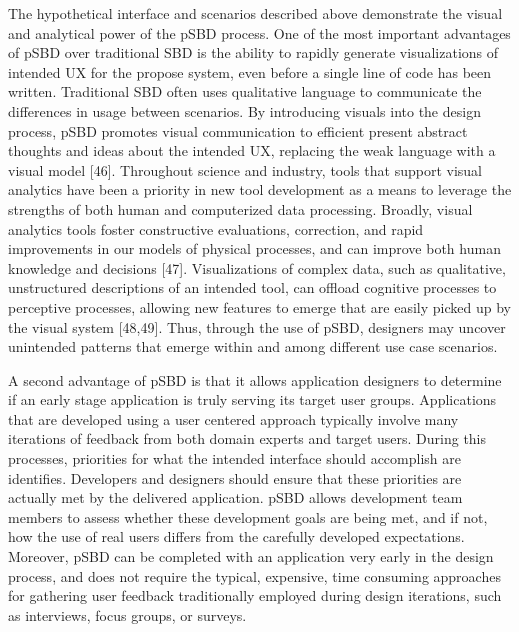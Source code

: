 \documentclass[]{article}
\begin{document}
The hypothetical interface and scenarios described above demonstrate the
visual and analytical power of the pSBD process. One of the most
important advantages of pSBD over traditional SBD is the ability to
rapidly generate visualizations of intended UX for the propose system,
even before a single line of code has been written. Traditional SBD
often uses qualitative language to communicate the differences in usage
between scenarios. By introducing visuals into the design process, pSBD
promotes visual communication to efficient present abstract thoughts and
ideas about the intended UX, replacing the weak language with a visual
model {[}46{]}. Throughout science and industry, tools that support
visual analytics have been a priority in new tool development as a means
to leverage the strengths of both human and computerized data
processing. Broadly, visual analytics tools foster constructive
evaluations, correction, and rapid improvements in our models of
physical processes, and can improve both human knowledge and decisions
{[}47{]}. Visualizations of complex data, such as qualitative,
unstructured descriptions of an intended tool, can offload cognitive
processes to perceptive processes, allowing new features to emerge that
are easily picked up by the visual system {[}48,49{]}. Thus, through the
use of pSBD, designers may uncover unintended patterns that emerge
within and among different use case scenarios.

A second advantage of pSBD is that it allows application designers to
determine if an early stage application is truly serving its target user
groups. Applications that are developed using a user centered approach
typically involve many iterations of feedback from both domain experts
and target users. During this processes, priorities for what the
intended interface should accomplish are identifies. Developers and
designers should ensure that these priorities are actually met by the
delivered application. pSBD allows development team members to assess
whether these development goals are being met, and if not, how the use
of real users differs from the carefully developed expectations.
Moreover, pSBD can be completed with an application very early in the
design process, and does not require the typical, expensive, time
consuming approaches for gathering user feedback traditionally employed
during design iterations, such as interviews, focus groups, or surveys.
\end{document}
